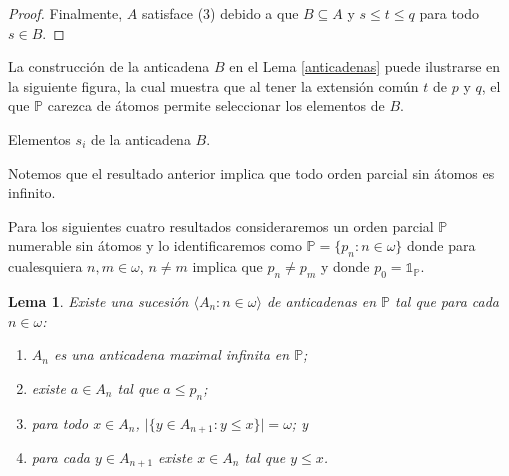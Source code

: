 \documentclass[11pt]{unam_tesis1}
\theoremstyle{MyThmStyle}
\theoremstyle{definition}
\theoremstyle{plain}
\newtheorem{lemma}[definition]{Lema}
\theoremstyle{remark}
\let\leq\leqslant
\begin{document}
\begin{proof}

Finalmente, $A$ satisface (3) debido a que $B\subseteq A$ y $s\leq t\leq q$ para todo $s\in B$.
\end{proof}

La construcci\'on de la anticadena $B$ en el Lema \ref{anticadenas} puede ilustrarse en la siguiente figura, la cual muestra que al tener la extensi\'on com\'un $t$ de $p$ y $q$, el que $\mathbb P$ carezca de \'atomos permite seleccionar los elementos de $B$.

\begin{center}

\centering
Elementos $s_i$ de la anticadena $B$.
\end{center}

Notemos que el resultado anterior implica que todo orden parcial sin \'atomos es infinito.

Para los siguientes cuatro resultados consideraremos un orden parcial $\mathbb P$ numerable sin \'atomos y lo identificaremos como $\mathbb P=\{p_n:n\in \omega\}$ donde para cualesquiera $n,m\in \omega$, $n\neq m$ implica que $p_n\neq p_m$ y donde $p_0=\mathds 1_{\mathbb P}$. 



\begin{lemma}\label{lemados}
Existe una sucesi\'on $\langle A_n:n\in \omega \rangle$ de anticadenas en $\mathbb P$ tal que para cada $n\in \omega$:

\begin{enumerate}

\item  $A_{n}$ es una anticadena maximal infinita en $\mathbb P$;
\item  existe $a\in A_n$ tal que $a\leq p_n$;
\item para todo $x\in A_n$, $\vert \{y\in A_{n+1}:y\leq x\}\vert=\omega$; y
\item para cada $y\in A_{n+1}$ existe $x\in A_n$ tal que $y\leq x$.

\end{enumerate}
\end{lemma}
\end{document}
